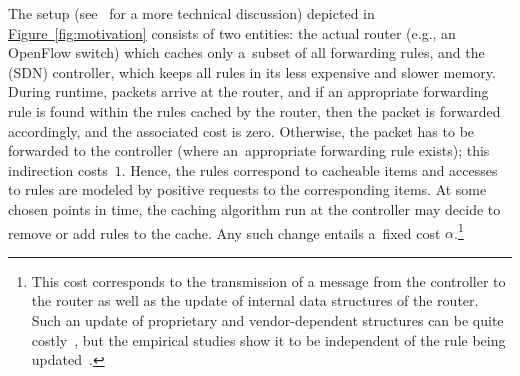 \documentclass[sigconf,screen=true]{acmart}
\newcommand{\lref}[2][]{\hyperref[#2]{#1~\ref*{#2}}}
\begin{document}
The setup (see~\cite{fibium-zipf} for a more technical discussion) depicted in
\lref[Figure]{fig:motivation} consists of two entities: the actual router 
(e.g., an OpenFlow switch) which caches only a~subset of all forwarding rules,
and the (SDN) controller, which keeps all rules in its less expensive and
slower memory. During runtime, packets arrive at the router, and if an
appropriate forwarding rule is found within the rules cached by the router,
then the packet is forwarded accordingly, and the associated cost is zero.
Otherwise, the packet has to be forwarded to the controller (where 
an~appropriate forwarding rule exists); this indirection costs~$1$. Hence, the
rules correspond to cacheable items and accesses to rules are modeled by
positive requests to the corresponding items. At some chosen points in time,
the caching algorithm run at the controller may decide to remove or add rules
to the cache. Any such change entails a~fixed cost $\alpha$.\footnote{This
cost corresponds to the transmission of a message from the controller to the
router as well as the update of internal data structures of the router. Such
an update of proprietary and vendor-dependent structures can be quite
costly~\cite{tcam-expensive-updates}, but the empirical studies show it to be
independent of the rule being updated~\cite{fib-updates}.}
\end{document}
